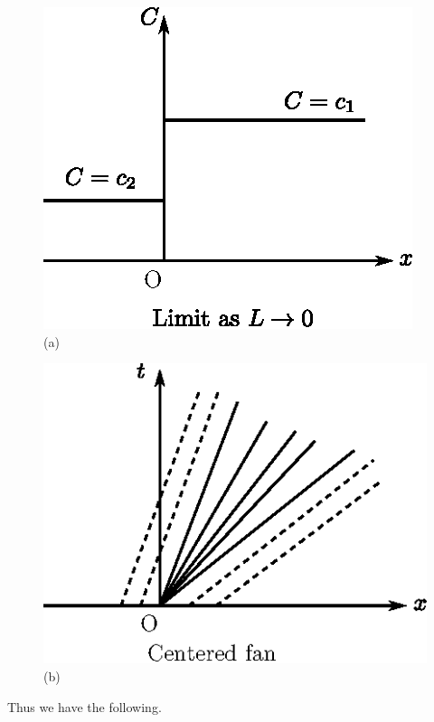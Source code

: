 \begin{center}
\begin{minipage}[t]{5cm}
\begin{figure}[H]
\centering
\includegraphics[scale=.9]{figures/fig61-1.5a.eps}
\caption{(a)}
\label{chap1:fig1.5a}
\end{figure}
\end{minipage}
\qquad
\begin{minipage}[t]{5cm}
\setcounter{figure}{4}
\begin{figure}[H]
\centering
\includegraphics[scale=.9]{figures/fig61-1.5b.eps}
\caption{(b)}
\label{chap1:fig1.5b}
\end{figure}
\end{minipage}
\end{center}

Thus we have the following.

